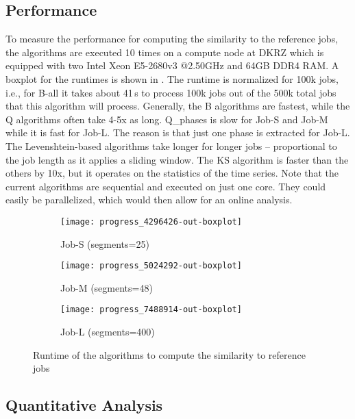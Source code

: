 \documentclass{jhps}
\begin{document}
\subsection{Performance}

To measure the performance for computing the similarity to the reference jobs, the algorithms are executed 10 times on a compute node at DKRZ which is equipped with two Intel Xeon E5-2680v3 @2.50GHz and 64GB DDR4 RAM.
A boxplot for the runtimes is shown in .
The runtime is normalized for 100k jobs, i.e., for B-all it takes about 41\,s to process 100k jobs out of the 500k total jobs that this algorithm will process.
Generally, the B algorithms are fastest, while the Q algorithms often take 4-5x as long.
Q\_phases is slow for Job-S and Job-M while it is fast for Job-L. 
The reason is that just one phase is extracted for Job-L.
The Levenshtein-based algorithms take longer for longer jobs -- proportional to the job length as it applies a sliding window.
The KS algorithm is faster than the others by 10x, but it operates on the statistics of the time series.
Note that the current algorithms are sequential and executed on just one core.
They could easily be parallelized, which would then allow for an online analysis.

\begin{figure}
\centering
  \begin{subfigure}{0.48\textwidth}
  \centering
  \texttt{[image: progress\_4296426-out-boxplot]}
  \caption{Job-S (segments=25)}\label{fig:perf-job-S}
  \end{subfigure}
  \begin{subfigure}{0.48\textwidth}
  \centering
  \texttt{[image: progress\_5024292-out-boxplot]}
  \caption{Job-M (segments=48)}\label{fig:perf-job-M}
  \end{subfigure}
  \begin{subfigure}{0.48\textwidth}
  \centering
  \texttt{[image: progress\_7488914-out-boxplot]}
  \caption{Job-L (segments=400)}\label{fig:perf-job-L}
  \end{subfigure}

  \caption{Runtime of the algorithms to compute the similarity to reference jobs}%
  \label{fig:performance}
\end{figure}


\subsection{Quantitative Analysis}
\end{document}
